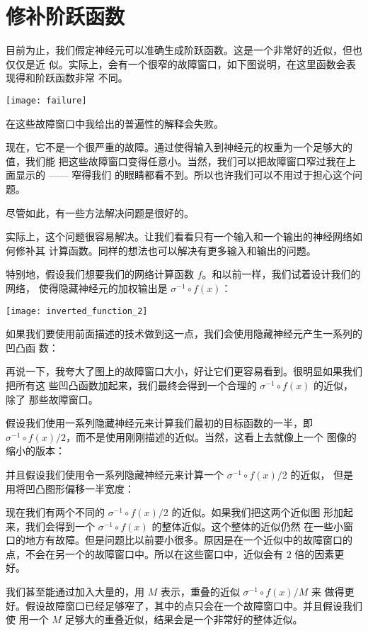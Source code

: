 \section{修补阶跃函数}
\label{sec:fixing_up_the_step_functions}

目前为止，我们假定神经元可以准确生成阶跃函数。这是一个非常好的近似，但也仅仅是近
似。实际上，会有一个很窄的故障窗口，如下图说明，在这里函数会表现得和阶跃函数非常
不同。
\begin{center}
  \texttt{[image: failure]}
\end{center}

在这些故障窗口中我给出的普遍性的解释会失败。

现在，它不是一个很严重的故障。通过使得输入到神经元的权重为一个足够大的值，我们能
把这些故障窗口变得任意小。当然，我们可以把故障窗口窄过我在上面显示的 —— 窄得我们
的眼睛都看不到。所以也许我们可以不用过于担心这个问题。

尽管如此，有一些方法解决问题是很好的。

实际上，这个问题很容易解决。让我们看看只有一个输入和一个输出的神经网络如何修补其
计算函数。同样的想法也可以解决有更多输入和输出的问题。

特别地，假设我们想要我们的网络计算函数 $f$。和以前一样，我们试着设计我们的网络，
使得隐藏神经元的加权输出是 $\sigma^{-1} \circ f(x)$：
\begin{center}
  \texttt{[image: inverted\_function\_2]}
\end{center}

如果我们要使用前面描述的技术做到这一点，我们会使用隐藏神经元产生一系列的凹凸函
数：

再说一下，我夸大了图上的故障窗口大小，好让它们更容易看到。很明显如果我们把所有这
些凹凸函数加起来，我们最终会得到一个合理的 $\sigma^{-1} \circ f(x)$ 的近似，除了
那些故障窗口。

假设我们使用一系列隐藏神经元来计算我们最初的目标函数的一半，即
$\sigma^{-1} \circ f(x) / 2$，而不是使用刚刚描述的近似。当然，这看上去就像上一个
图像的缩小的版本：

并且假设我们使用令一系列隐藏神经元来计算一个 $\sigma^{-1} \circ f(x) / 2$ 的近似，
但是用将凹凸图形偏移一半宽度：

现在我们有两个不同的 $\sigma^{-1} \circ f(x) / 2$ 的近似。如果我们把这两个近似图
形加起来，我们会得到一个 $\sigma^{-1} \circ f(x)$ 的整体近似。这个整体的近似仍然
在一些小窗口的地方有故障。但是问题比以前要小很多。原因是在一个近似中的故障窗口的
点，不会在另一个的故障窗口中。所以在这些窗口中，近似会有 $2$ 倍的因素更好。

我们甚至能通过加入大量的，用 $M$ 表示，重叠的近似 $\sigma^{-1} \circ f(x) / M$ 来
做得更好。假设故障窗口已经足够窄了，其中的点只会在一个故障窗口中。并且假设我们使
用一个 $M$ 足够大的重叠近似，结果会是一个非常好的整体近似。

